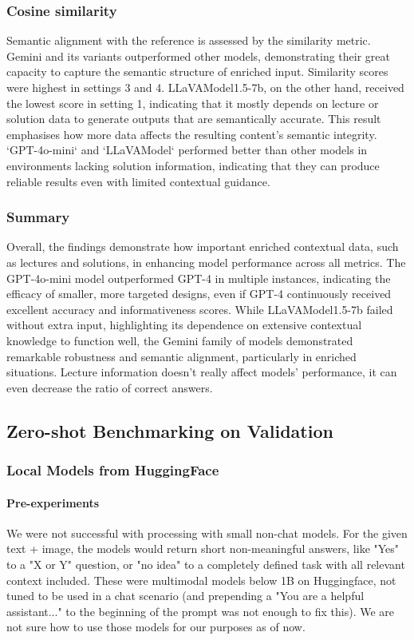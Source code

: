 \documentclass{article}
\begin{document}
\subsubsection{Cosine similarity}
Semantic alignment with the reference is assessed by the similarity metric. Gemini and its variants outperformed other models, demonstrating their great capacity to capture the semantic structure of enriched input. Similarity scores were highest in settings 3 and 4. LLaVAModel1.5-7b, on the other hand, received the lowest score in setting 1, indicating that it mostly depends on lecture or solution data to generate outputs that are semantically accurate. This result emphasises how more data affects the resulting content's semantic integrity. `GPT-4o-mini` and `LLaVAModel` performed better than other models in environments lacking solution information, indicating that they can produce reliable results even with limited  contextual guidance.

\subsubsection{Summary}
Overall, the findings demonstrate how important enriched contextual data, such as lectures and solutions, in enhancing model performance across all metrics. The GPT-4o-mini model outperformed GPT-4 in multiple instances, indicating the efficacy of smaller, more targeted designs, even if GPT-4 continuously received excellent accuracy and informativeness scores. While LLaVAModel1.5-7b failed without extra input, highlighting its dependence on extensive contextual knowledge to function well, the Gemini family of models demonstrated remarkable robustness and semantic alignment, particularly in enriched situations.
Lecture information doesn’t really affect models’ performance, it can even decrease the ratio of correct answers.


\subsection{Zero-shot Benchmarking on Validation}
\subsubsection{Local Models from HuggingFace}

\paragraph{Pre-experiments} We were not successful with processing with small non-chat models. For the given text + image, the models would return short non-meaningful answers, like "Yes" to a "X or Y" question, or "no idea" to a completely defined task with all relevant context included. These were multimodal models below 1B on Huggingface, not tuned to be used in a chat scenario (and prepending a "You are a helpful assistant..." to the beginning of the prompt was not enough to fix this). 
We are not sure how to use those models for our purposes as of now. 
\end{document}
